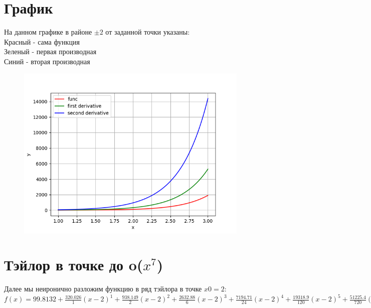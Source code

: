 \documentclass[a4paper]{article}
\begin{document}
\section{График}
На данном графике в районе $\pm 2$ от заданной точки указаны: \\
Красный - сама функция \\
Зеленый - первая производная \\
Синий - вторая производная \\
\begin{figure}[H]
\centering
\includegraphics{graph.png}
\end{figure}\section{Тэйлор в точке до o($x^7$)}
Далее мы неиронично разложим функцию в ряд тэйлора в точке $x0 = 2$: \\
$f(x) = 99.8132 + \frac{320.026}{1}(x-2)^{1} + \frac{938.149}{2}(x-2)^{2} + \frac{2632.88}{6}(x-2)^{3} + \frac{7194.71}{24}(x-2)^{4} + \frac{19318.9}{120}(x-2)^{5} + \frac{51225.4}{720}(x-2)^{6} + \frac{134582}{5040}(x-2)^{7} + o(x^7)$
\end{document}
